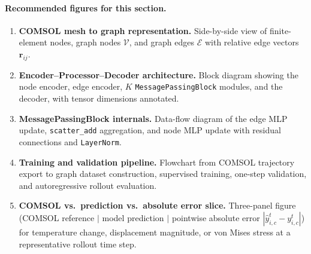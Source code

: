 \paragraph*{Recommended figures for this section.}
\begin{enumerate}
  \item \textbf{COMSOL mesh to graph representation.}
        Side-by-side view of finite-element nodes, graph nodes
        \(\mathcal{V}\), and graph edges \(\mathcal{E}\) with relative edge
        vectors \(\mathbf{r}_{ij}\).
  \item \textbf{Encoder--Processor--Decoder architecture.}
        Block diagram showing the node encoder, edge encoder, \(K\)
        \texttt{MessagePassingBlock} modules, and the decoder, with tensor
        dimensions annotated.
  \item \textbf{MessagePassingBlock internals.}
        Data-flow diagram of the edge MLP update, \texttt{scatter\_add}
        aggregation, and node MLP update with residual connections and
        \texttt{LayerNorm}.
  \item \textbf{Training and validation pipeline.}
        Flowchart from COMSOL trajectory export to graph dataset construction,
        supervised training, one-step validation, and autoregressive rollout
        evaluation.
  \item \textbf{COMSOL vs.\ prediction vs.\ absolute error slice.}
        Three-panel figure (COMSOL reference \(\mid\) model prediction \(\mid\)
        pointwise absolute error \(|\hat{y}_{i,c}^t-y_{i,c}^t|\)) for
        temperature change, displacement magnitude, or von Mises stress
        at a representative rollout time step.
\end{enumerate}